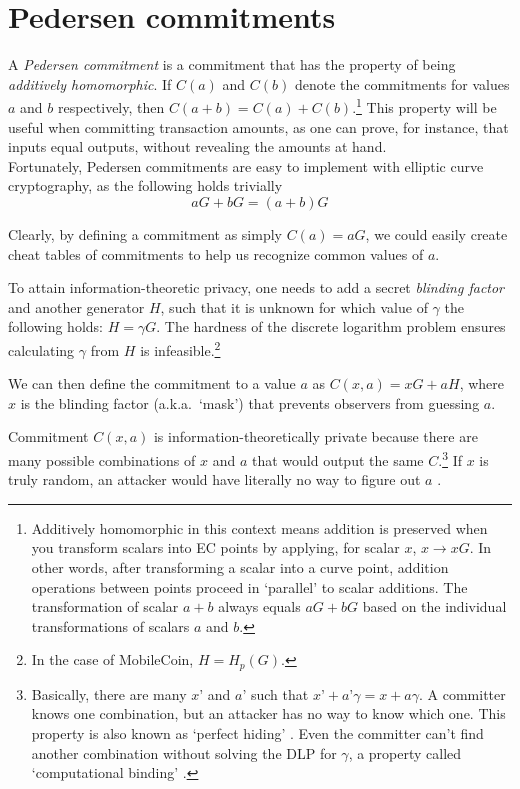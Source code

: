 \section{Pedersen commitments}
\label{sec:pedersen-intro}

A {\em Pedersen commitment} \cite{Pedersen1992} is a commitment that has the property of being {\em additively homomorphic}. If \(C(a)\) and \(C(b)\) denote the commitments for values \(a\) and \(b\) respectively, then \(C(a + b) = C(a) + C(b)\).\footnote{Additively homomorphic in this context means addition is preserved when you transform scalars into EC points by applying, for scalar $x$, $x \rightarrow x G$. In other words, after transforming a scalar into a curve point, addition operations between points proceed in `parallel' to scalar additions. The transformation of scalar $a + b$ always equals $a G + b G$ based on the individual transformations of scalars $a$ and $b$.} This property will be useful when committing transaction amounts, as one can prove, for instance, that inputs equal outputs, without revealing the amounts at hand.
\\

Fortunately, Pedersen commitments are easy to implement with elliptic curve cryptography, as the following holds trivially \[a G + b G = (a + b) G\]

Clearly, by defining a commitment as simply \(C(a) = a G\), we could easily create cheat tables of commitments to help us recognize common values of $a$.

To attain information-theoretic privacy, one needs to add a secret {\em blinding factor} and another generator \(H\), such that it is unknown for which value of \(\gamma\) the following holds: \(H = \gamma G\). The hardness of the discrete logarithm problem ensures calculating $\gamma$ from $H$ is infeasible.\footnote{In the case of MobileCoin, $H = H_p(G)$.}

We can then define the commitment to a value \(a\) as \(C(x, a) = x G + a H\), where \(x\) is the blinding factor (a.k.a.\ `mask') that prevents observers from guessing $a$.

Commitment $C(x, a)$ is information-theoretically private because there are many possible combinations of $x$ and $a$ that would output the same $C$.\footnote{Basically, there are many $x’$ and $a’$ such that $x’+a’ \gamma = x+a \gamma$. A committer knows one combination, but an attacker has no way to know which one. This property is also known as `perfect hiding' \cite{adam-zero-to-bulletproofs}. Even the committer can't find another combination without solving the DLP for $\gamma$, a property called `computational binding' \cite{adam-zero-to-bulletproofs}.} If $x$ is truly random, an attacker would have literally no way to figure out $a$ \cite{maxwell-ct-2, SCOZZAFAVA1993313}.%



